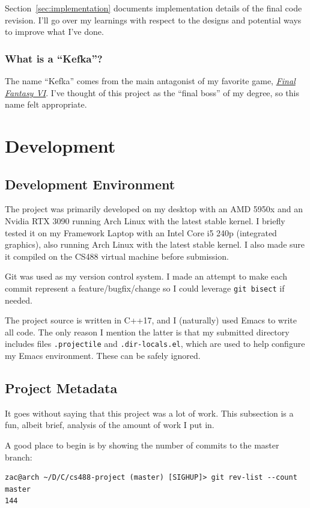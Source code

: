 \documentclass {article}
\begin{document}
Section~\ref{sec:implementation} documents implementation details of the final code revision. I'll go over my learnings with respect to the designs and potential ways to improve what I've done.

\subsubsection{What is a ``Kefka''?}
The name ``Kefka'' comes from the main antagonist of my favorite game, \href{https://en.wikipedia.org/wiki/Final_Fantasy_VI}{\textit{Final Fantasy VI}}. I've thought of this project as the ``final boss'' of my degree, so this name felt appropriate.

\section{Development}
\subsection{Development Environment}\label{sec:devenv}
The project was primarily developed on my desktop with an AMD 5950x and an Nvidia RTX 3090 running Arch Linux with the latest stable kernel. I briefly tested it on my Framework Laptop with an Intel Core i5 240p (integrated graphics), also running Arch Linux with the latest stable kernel. I also made sure it compiled on the CS488 virtual machine before submission.

Git was used as my version control system. I made an attempt to make each commit represent a feature/bugfix/change so I could leverage \texttt{git bisect} if needed.

The project source is written in C++17, and I (naturally) used Emacs to write all code. The only reason I mention the latter is that my submitted directory includes files \texttt{.projectile} and \texttt{.dir-locals.el}, which are used to help configure my Emacs environment. These can be safely ignored.

\subsection{Project Metadata}
It goes without saying that this project was a lot of work. This subsection is a fun, albeit brief, analysis of the amount of work I put in.

A good place to begin is by showing the number of commits to the master branch:
\begin{verbatim}
zac@arch ~/D/C/cs488-project (master) [SIGHUP]> git rev-list --count master
144
\end{verbatim}
\end{document}
